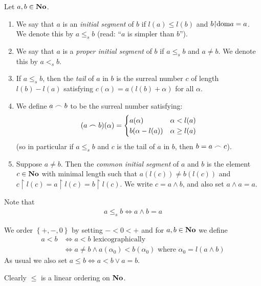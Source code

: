 \begin{defn}
	Let $a, b \in \mathbf{No}$. 
	\begin{enumerate}
		\item We say that $a$ is an \emph{initial segment} of 
			$b$ if $l(a) \leq l(b)$ and $b \mathord{\upharpoonright} 
			\textrm{dom}{a} = a$. We denote this by $a \leq_s b$
			(read: ``$a$ is simpler than $b$''). 
		\item We say that $a$ is a \emph{proper initial segment}
			of $b$ if $a \leq_s b$ and $a \neq b$. We denote 
			this by $a <_s b$. 
		\item If $a \leq_s b$, then the \emph{tail} of $a$ in 
			$b$ is the surreal number $c$ of length 
			$l(b) - l(a)$ satisfying $c(\alpha) = 
			a(l(b) + \alpha)$ for all $\alpha$. 
		\item We define $a \frown b$ to be the surreal number 
			satisfying: 
			\begin{align*}
				(a \frown b)(\alpha) = 
				\begin{cases}
					a(\alpha) & \alpha < l(a) \\
					b(\alpha - l(a)) & \alpha \geq l(a)
				\end{cases}
			\end{align*}
			(so in particular if $a \leq_s b$ and $c$ is the tail 
			of $a$ in $b$, then $b = a \frown c$). 
		\item Suppose $a \neq b$. Then the \emph{common initial 
			segment} of $a$ and $b$ is the element 
			$c \in \mathbf{No}$ with minimal length such that 
			$a(l(c)) \neq b(l(c))$ and $c \restriction l(c) 
			= a \restriction 
			l(c) = b \restriction l(c)$. We write 
			$c = a \wedge b$, and also set $a \wedge a = a$. 
	\end{enumerate}
\end{defn}
Note that 
\begin{align*}
	a \leq_s b \iff a \wedge b = a
\end{align*}

\begin{defn}
	We order $\left\{ +, -, 0 \right\}$ by setting
	$- < 0 < +$ and for $a, b \in \mathbf{No}$ we define
	\begin{align*}
		a < b &\iff a < b \text{ lexicographically} \\
		&\iff a \neq b \land a(\alpha_0) < b(\alpha_0) 
		\text{ where } \alpha_0 = l(a \wedge b)
	\end{align*}
	As usual we also set $a \leq b \iff a < b \lor a = b$. 
\end{defn}
Clearly $\leq$ is a linear ordering on $\mathbf{No}$. 

